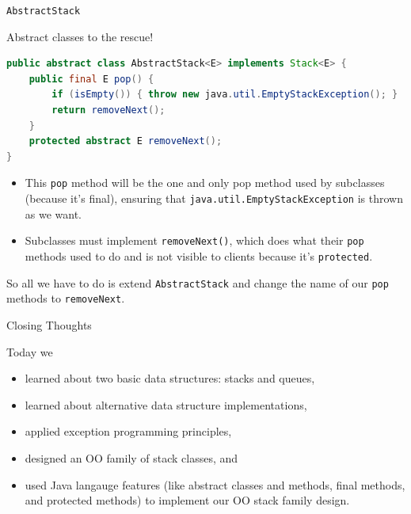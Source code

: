 \documentclass{beamer}
\begin{document}
\begin{frame}[fragile]{{\tt AbstractStack}}


Abstract classes to the rescue!
\begin{lstlisting}[language=Java]
public abstract class AbstractStack<E> implements Stack<E> {
    public final E pop() {
        if (isEmpty()) { throw new java.util.EmptyStackException(); }
        return removeNext();
    }
    protected abstract E removeNext();
}
\end{lstlisting}

\begin{itemize}
\item This {\tt pop} method will be the one and only pop method used by subclasses (because it's final), ensuring that {\tt java.util.EmptyStackException} is thrown as we want.
\item Subclasses must implement {\tt removeNext()}, which does what their {\tt pop} methods used to do and is not visible to clients because it's {\tt protected}.
\end{itemize}

So all we have to do is extend {\tt AbstractStack} and change the name of our {\tt pop} methods to {\tt removeNext}.

\end{frame}

\begin{frame}[fragile]{Closing Thoughts}


Today we
\begin{itemize}
\item learned about two basic data structures: stacks and queues,
\item learned about alternative data structure implementations,
\item applied exception programming principles,
\item designed an OO family of stack classes, and
\item used Java langauge features (like abstract classes and methods, final methods, and protected methods) to implement our OO stack family design.
\end{itemize}


\end{frame}
\end{document}
